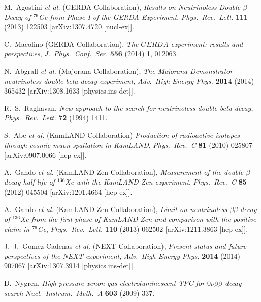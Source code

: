\documentclass{PoS}
\begin{document}
\begin{thebibliography}{99}
   M.~Agostini {\it et al.} (GERDA Collaboration),
   \emph{Results on Neutrinoless Double-$\beta$ Decay of $^{76}$Ge from Phase I of the GERDA Experiment},
   \emph{Phys.\ Rev.\ Lett.} {\bf 111} (2013) 122503
   [arXiv:1307.4720 [nucl-ex]].

   C.~Macolino (GERDA Collaboration),
   \emph{The $GERDA$ experiment: results and perspectives},
   \emph{J.\ Phys.\ Conf.\ Ser.} {\bf 556} (2014) 1,  012063.

   N.~Abgrall {\it et al.} (Majorana Collaboration),
   \emph{The Majorana Demonstrator neutrinoless double-beta decay experiment},
   \emph{Adv.\ High Energy Phys.} {\bf 2014} (2014) 365432
   [arXiv:1308.1633 [physics.ins-det]].

   R.~S.~Raghavan,
   \emph{New approach to the search for neutrinoless double beta decay},
   \emph{Phys.\ Rev.\ Lett.} {\bf 72} (1994) 1411.

   S.~Abe {\it et al.} (KamLAND Collaboration)
   \emph{Production of radioactive isotopes through cosmic muon spallation in KamLAND},
   \emph{Phys.\ Rev.\ C} {\bf 81} (2010) 025807
   [arXiv:0907.0066 [hep-ex]].

   A.~Gando {\it et al.} (KamLAND-Zen Collaboration),
   \emph{Measurement of the double-$\beta$ decay half-life of $^{136}$Xe with the KamLAND-Zen experiment},
   \emph{Phys.\ Rev.\ C} {\bf 85} (2012) 045504
   [arXiv:1201.4664 [hep-ex]].

   A.~Gando {\it et al.} (KamLAND-Zen Collaboration),
   \emph{Limit on neutrinoless $\beta\beta$ decay of $^{136}$Xe from the first phase of KamLAND-Zen and comparison with the positive claim in $^{76}$Ge},
   \emph{Phys.\ Rev.\ Lett.}  {\bf 110} (2013) 062502
   [arXiv:1211.3863 [hep-ex]].

   J.~J.~Gomez-Cadenas {\it et al.} (NEXT Collaboration),
   \emph{Present status and future perspectives of the NEXT experiment},
   \emph{Adv.\ High Energy Phys.} {\bf 2014} (2014) 907067
   [arXiv:1307.3914 [physics.ins-det]].

   D.~Nygren,
   \emph{High-pressure xenon gas electroluminescent TPC for $0\nu\beta\beta$-decay search}
   \emph{Nucl.\ Instrum.\ Meth.\ A} {\bf 603} (2009) 337.



\end{thebibliography}
\end{document}
